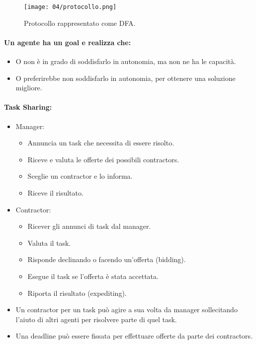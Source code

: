 \begin{figure}[!h]
    \centering
    \texttt{[image: 04/protocollo.png]}
  \caption{Protocollo rappresentato come DFA.}
\end{figure}


\paragraph{Un agente ha un goal e realizza che:}

\begin{itemize}
  \item O non è in grado di soddisfarlo in autonomia, ma non ne ha le capacità. 
  \item O preferirebbe non soddisfarlo in autonomia, per ottenere una soluzione migliore.
\end{itemize}

\paragraph{Task Sharing:}

\begin{itemize}
  \item Manager: 
    \begin{itemize}
      \item Annuncia un task che necessita di essere risolto. 
      \item Riceve e valuta le offerte dei possibili contractors. 
      \item Sceglie un contractor e lo informa. 
      \item Riceve il risultato.
    \end{itemize}
  \item Contractor: 
    \begin{itemize}
      \item Ricever gli annunci di task dal manager. 
      \item Valuta il task. 
      \item Risponde declinando o facendo un'offerta (bidding). 
      \item Esegue il task se l'offerta è stata accettata. 
      \item Riporta il risultato (expediting).
    \end{itemize}
  \item Un contractor per un task può agire a sua volta da manager sollecitando l'aiuto di altri agenti per risolvere parte di quel task. 
  \item Una deadline può essere fissata per effettuare offerte da parte dei contractors.
\end{itemize}

